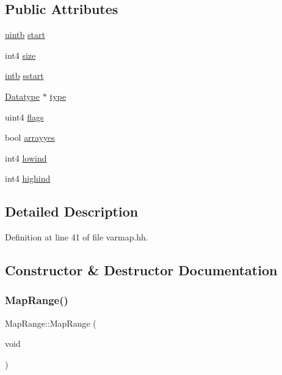 \subsection*{Public Attributes}
\begin{DoxyCompactItemize}
\item 
\mbox{\hyperlink{types_8h_a2db313c5d32a12b01d26ac9b3bca178f}{uintb}} \mbox{\hyperlink{struct_map_range_ae037353557a2207171b67f13cee7b3e7}{start}}
\item 
int4 \mbox{\hyperlink{struct_map_range_ae1f42ce044f606f67a880ca2fe8e90b7}{size}}
\item 
\mbox{\hyperlink{types_8h_aa925ba3e627c2df89d5b1cfe84fb8572}{intb}} \mbox{\hyperlink{struct_map_range_a1bdc3b362845acf405fc8b3cde537e8a}{sstart}}
\item 
\mbox{\hyperlink{class_datatype}{Datatype}} $\ast$ \mbox{\hyperlink{struct_map_range_ada4eac8eb9826b1455eef173a6e5d960}{type}}
\item 
uint4 \mbox{\hyperlink{struct_map_range_afa1d0275d37ed7ed5e7971fcca0e9814}{flags}}
\item 
bool \mbox{\hyperlink{struct_map_range_a813c3cb287656c1894baaa075d6da72a}{arrayyes}}
\item 
int4 \mbox{\hyperlink{struct_map_range_a9fe9bca51c84c321bb5e8293b9f5a09a}{lowind}}
\item 
int4 \mbox{\hyperlink{struct_map_range_a07afd2566a9e2f5c89c630d668aabe6e}{highind}}
\end{DoxyCompactItemize}


\subsection{Detailed Description}


Definition at line 41 of file varmap.\+hh.



\subsection{Constructor \& Destructor Documentation}
\mbox{\label{struct_map_range_a819c683a1de6677ad4da86f1e9d9027e}} 
\subsubsection{\texorpdfstring{MapRange()}{MapRange()}\hspace{0.1cm}{\footnotesize\ttfamily [1/2]}}
{\footnotesize\ttfamily Map\+Range\+::\+Map\+Range (\begin{DoxyParamCaption}\item[{void}]{ }\end{DoxyParamCaption})\hspace{0.3cm}{\ttfamily [inline]}}



